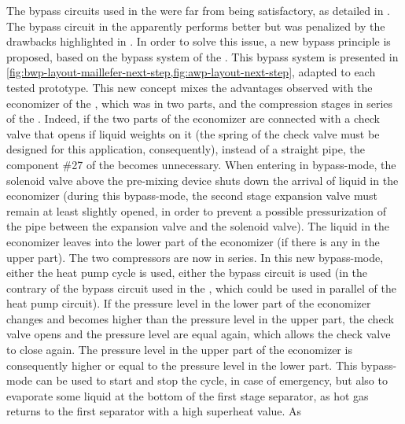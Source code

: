 The bypass circuits used in the \AWP{} were far from being
satisfactory, as detailed in . The bypass
circuit in the \BWP{} apparently performs better but was penalized by
the drawbacks highlighted in
. In order to solve this issue,
a new bypass principle is proposed, based on the bypass system of the
\BWP{}. This bypass system is presented in
\cref{fig:bwp-layout-maillefer-next-step,fig:awp-layout-next-step},
adapted to each tested prototype. This new concept mixes the
advantages observed with the economizer of the \AWP{}, which was in
two parts, and the compression stages in series of the \BWP{}. Indeed,
if the two parts of the economizer are connected with a check valve
that opens if liquid weights on it (the spring of the check valve must
be designed for this application, consequently), instead of a straight
pipe, the component \#27 of the \BWP{} becomes unnecessary. When
entering in bypass-mode, the solenoid valve above the pre-mixing
device  shuts down the
arrival of liquid in the economizer (during this bypass-mode, the
second stage expansion valve must remain at least slightly opened, in
order to prevent a possible pressurization of the pipe between the
expansion valve and the solenoid valve). The liquid in the economizer
leaves into the lower part of the economizer (if there is any in the
upper part). The two compressors are now in series. In this new
bypass-mode, either the heat pump cycle is used, either the bypass
circuit is used (in the contrary of the bypass circuit used in the
\BWP{}, which could be used in parallel of the heat pump circuit). If
the pressure level in the lower part of the economizer changes and
becomes higher than the pressure level in the upper part, the check valve opens and the pressure level are equal
again, which allows the check valve to close again. The pressure level
in the upper part of the economizer is consequently higher or equal to
the pressure level in the lower part. This bypass-mode can be used to
start and stop the cycle, in case of emergency, but also to evaporate
some liquid at the bottom of the first stage separator, as hot gas
returns to the first separator with a high superheat value. As

